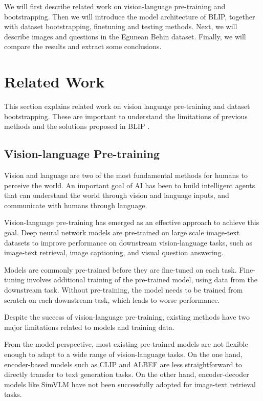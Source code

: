 \documentclass[11pt]{article}
\begin{document}
We will first describe related work on vision-language pre-training and bootstrapping. Then we will introduce the model architecture of BLIP, together with dataset bootstrapping, finetuning and testing methods. Next, we will describe images and questions in the Egunean Behin dataset. Finally, we will compare the results and extract some conclusions.

\section{Related Work}

This section explains related work on vision language pre-training and dataset bootstrapping. These are important to understand the limitations of previous methods and the solutions proposed in BLIP \cite{li2022blip}.

\subsection{Vision-language Pre-training}

Vision and language are two of the most fundamental methods for humans to perceive the world. An important goal of AI has been to build intelligent agents that can understand the world through vision and language inputs, and communicate with humans through language.

Vision-language pre-training has emerged as an effective approach to achieve this goal. Deep neural network models are pre-trained on large scale image-text datasets to improve performance on downstream vision-language tasks, such as image-text retrieval, image captioning, and visual question answering.

Models are commonly pre-trained before they are fine-tuned on each task. Fine-tuning involves additional training of the pre-trained model, using data from the downstream task. Without pre-training, the model needs to be trained from scratch on each downstream task, which leads to worse performance.

Despite the success of vision-language pre-training, existing methods have two major limitations related to models and training data.

From the model perspective, most existing pre-trained models are not flexible enough to adapt to a wide range of vision-language tasks. On the one hand, encoder-based models such as CLIP \cite{radford2021learning} and ALBEF \cite{li2021align} are less straightforward to directly transfer to text generation tasks. On the other hand, encoder-decoder models like SimVLM \cite{wang2021simvlm} have not been successfully adopted for image-text retrieval tasks.
\end{document}
